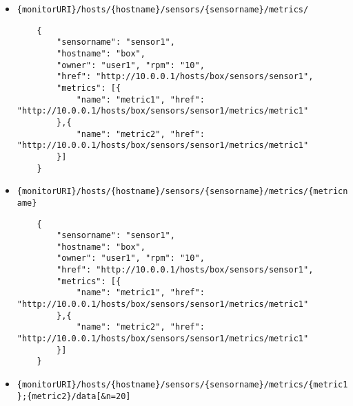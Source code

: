 \documentclass[a4paper]{article}
\begin{document}
\begin{itemize}
\begin{verbatim}
	{
		"sensorname": "sensor1",
		"hostname": "box",
		"href": "http://10.0.0.1/hosts/box/sensors/sensor1",
		"owner": "user1", "rpm": "10"
	}
	\end{verbatim}
	\item \texttt{\{monitorURI\}/hosts/\{hostname\}/sensors/\{sensorname\}/metrics/}
	\begin{verbatim}
	{
		"sensorname": "sensor1",
		"hostname": "box",
		"owner": "user1", "rpm": "10",
		"href": "http://10.0.0.1/hosts/box/sensors/sensor1",
		"metrics": [{
			"name": "metric1", "href": "http://10.0.0.1/hosts/box/sensors/sensor1/metrics/metric1"
		},{
			"name": "metric2", "href": "http://10.0.0.1/hosts/box/sensors/sensor1/metrics/metric1"
		}]
	}
	\end{verbatim}
	\item \texttt{\{monitorURI\}/hosts/\{hostname\}/sensors/\{sensorname\}/metrics/\{metricname\}}
	\begin{verbatim}
	{
		"sensorname": "sensor1",
		"hostname": "box",
		"owner": "user1", "rpm": "10",
		"href": "http://10.0.0.1/hosts/box/sensors/sensor1",
		"metrics": [{
			"name": "metric1", "href": "http://10.0.0.1/hosts/box/sensors/sensor1/metrics/metric1"
		},{
			"name": "metric2", "href": "http://10.0.0.1/hosts/box/sensors/sensor1/metrics/metric1"
		}]
	}
	\end{verbatim}
	\item \texttt{\{monitorURI\}/hosts/\{hostname\}/sensors/\{sensorname\}/metrics/\{metric1\};\{metric2\}/data[\&n=20]}
\end{itemize}
\end{document}
